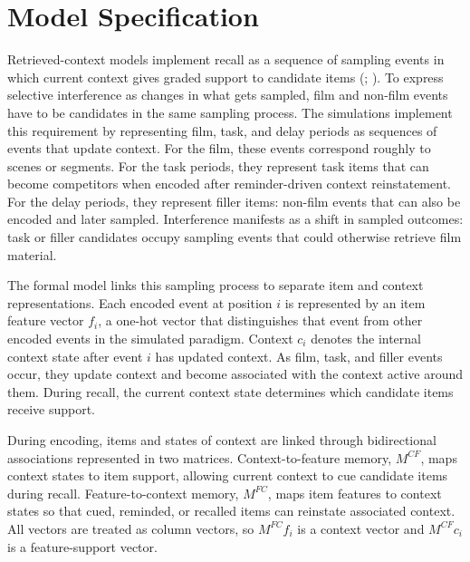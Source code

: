 \documentclass[
  man,
  floatsintext,
  longtable,
  nolmodern,
  notxfonts,
  notimes,
  draftfirst,
  colorlinks=true,linkcolor=blue,citecolor=blue,urlcolor=blue]{apa7}
\begin{document}
\section{Model Specification}\label{model-specification}

Retrieved-context models implement recall as a sequence of sampling
events in which current context gives graded support to candidate items
(;
). To express
selective interference as changes in what gets sampled, film and
non-film events have to be candidates in the same sampling process. The
simulations implement this requirement by representing film, task, and
delay periods as sequences of events that update context. For the film,
these events correspond roughly to scenes or segments. For the task
periods, they represent task items that can become competitors when
encoded after reminder-driven context reinstatement. For the delay
periods, they represent filler items: non-film events that can also be
encoded and later sampled. Interference manifests as a shift in sampled
outcomes: task or filler candidates occupy sampling events that could
otherwise retrieve film material.

The formal model links this sampling process to separate item and
context representations. Each encoded event at position \(i\) is
represented by an item feature vector \(f_i\), a one-hot vector that
distinguishes that event from other encoded events in the simulated
paradigm. Context \(c_i\) denotes the internal context state after event
\(i\) has updated context. As film, task, and filler events occur, they
update context and become associated with the context active around
them. During recall, the current context state determines which
candidate items receive support.

During encoding, items and states of context are linked through
bidirectional associations represented in two matrices.
Context-to-feature memory, \(M^{CF}\), maps context states to item
support, allowing current context to cue candidate items during recall.
Feature-to-context memory, \(M^{FC}\), maps item features to context
states so that cued, reminded, or recalled items can reinstate
associated context. All vectors are treated as column vectors, so
\(M^{FC} f_i\) is a context vector and \(M^{CF} c_i\) is a
feature-support vector.
\end{document}
